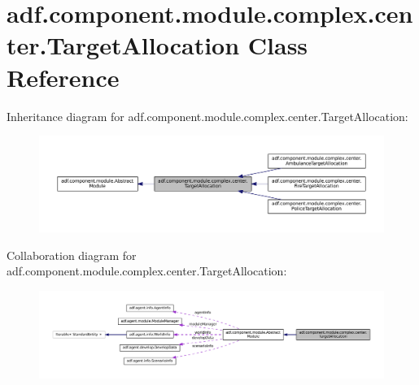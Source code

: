 \hypertarget{classadf_1_1component_1_1module_1_1complex_1_1center_1_1TargetAllocation}{}\section{adf.\+component.\+module.\+complex.\+center.\+Target\+Allocation Class Reference}
\label{classadf_1_1component_1_1module_1_1complex_1_1center_1_1TargetAllocation}


Inheritance diagram for adf.\+component.\+module.\+complex.\+center.\+Target\+Allocation\+:
\nopagebreak
\begin{figure}[H]
\begin{center}
\leavevmode
\includegraphics[width=350pt]{classadf_1_1component_1_1module_1_1complex_1_1center_1_1TargetAllocation__inherit__graph}
\end{center}
\end{figure}


Collaboration diagram for adf.\+component.\+module.\+complex.\+center.\+Target\+Allocation\+:
\nopagebreak
\begin{figure}[H]
\begin{center}
\leavevmode
\includegraphics[width=350pt]{classadf_1_1component_1_1module_1_1complex_1_1center_1_1TargetAllocation__coll__graph}
\end{center}
\end{figure}

